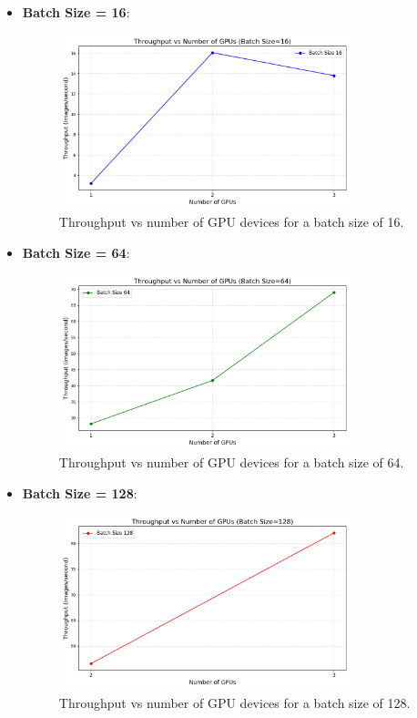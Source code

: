\documentclass{article}
\begin{document}
\begin{itemize}
    \item \textbf{Batch Size = 16}:
    \begin{figure}[h!]
        \centering
        \includegraphics[width=0.8\textwidth]{GPU/throughput_bs16.png}
        \caption{Throughput vs number of GPU devices for a batch size of 16.}
        \label{fig:throughput_bs16}
    \end{figure}
\newpage
    \item \textbf{Batch Size = 64}:
    \begin{figure}[h!]
        \centering
        \includegraphics[width=0.8\textwidth]{GPU/throughput_bs64.png}
        \caption{Throughput vs number of GPU devices for a batch size of 64.}
        \label{fig:throughput_bs64}
    \end{figure}

    \item \textbf{Batch Size = 128}:\\
    \begin{figure}[h!]
        \centering
        \includegraphics[width=0.8\textwidth]{GPU/throughput_bs128.png}
        \caption{Throughput vs number of GPU devices for a batch size of 128.}
        \label{fig:throughput_bs128}
    \end{figure}
\end{itemize}
\newpage
\end{document}

